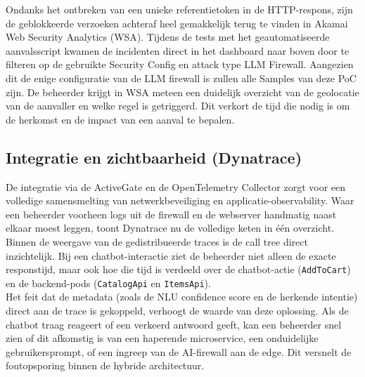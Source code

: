 Ondanks het ontbreken van een unieke referentietoken in de HTTP-respons, zijn de geblokkeerde verzoeken achteraf heel gemakkelijk terug te vinden in Akamai Web Security Analytics (WSA). Tijdens de tests met het geautomatiseerde aanvalsscript kwamen de incidenten direct in het dashboard naar boven door te filteren op de gebruikte Security Config en attack type LLM Firewall. Aangezien dit de enige configuratie van de LLM firewall is zullen alle Samples van deze PoC zijn. De beheerder krijgt in WSA meteen een duidelijk overzicht van de geolocatie van de aanvaller en welke regel is getriggerd. Dit verkort de tijd die nodig is om de herkomst en de impact van een aanval te bepalen.

\subsection{Integratie en zichtbaarheid (Dynatrace)}
De integratie via de ActiveGate en de OpenTelemetry Collector zorgt voor een volledige samensmelting van netwerkbeveiliging en applicatie-observability. Waar een beheerder voorheen logs uit de firewall en de webserver handmatig naast elkaar moest leggen, toont Dynatrace nu de volledige keten in één overzicht.\\

Binnen de weergave van de gedistribueerde traces is de call tree direct inzichtelijk. Bij een chatbot-interactie ziet de beheerder niet alleen de exacte responstijd, maar ook hoe die tijd is verdeeld over de chatbot-actie (\texttt{AddToCart}) en de backend-pods (\texttt{CatalogApi} en \texttt{ItemsApi}). \\

Het feit dat de metadata (zoals de NLU confidence score en de herkende intentie) direct aan de trace is gekoppeld, verhoogt de waarde van deze oplossing. Als de chatbot traag reageert of een verkeerd antwoord geeft, kan een beheerder snel zien of dit afkomstig is van een haperende microservice, een onduidelijke gebruikersprompt, of een ingreep van de AI-firewall aan de edge. Dit versnelt de foutopsporing binnen de hybride architectuur.
